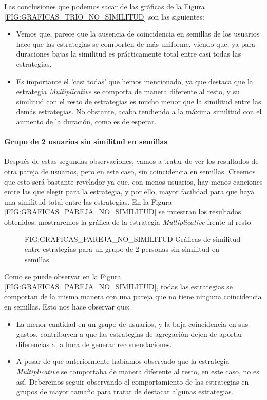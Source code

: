 Las conclusiones que podemos sacar de las gráficas de la Figura \ref{FIG:GRAFICAS_TRIO_NO_SIMILITUD} son las siguientes:

\begin{itemize}
    \item Vemos que, parece que la ausencia de coincidencia en semillas de los usuarios hace que las estrategias se comporten de más uniforme, viendo que, ya para duraciones
    bajas la similitud es prácticamente total entre casi todas las estrategias.
    \item Es importante el 'casi todas' que hemos mencionado, ya que destaca que la estrategia \textit{Multiplicative} se comporta de manera diferente al resto, y su similitud con el resto de estrategias
    es mucho menor que la similitud entre las demás estrategias. No obstante, acaba tendiendo a la máxima similitud con el aumento de la duración, como es de esperar.
\end{itemize}

\paragraph{Grupo de 2 usuarios sin similitud en semillas}

Después de estas segundas observaciones, vamos a tratar de ver los resultados de otra pareja de usuarios, pero en este caso, sin coincidencia en semillas. 
Creemos que esto será bastante revelador ya que, con menos usuarios, hay menos canciones entre las que elegir para la estrategia, y por ello, 
mayor facilidad para que haya una similitud total entre las estrategias.
En la Figura \ref{FIG:GRAFICAS_PAREJA_NO_SIMILITUD} se muestran los resultados obtenidos, mostraremos la gráfica de la estrategia \textit{Multiplicative} 
frente al resto.

\begin{figure}[Gráficas de similitud entre estrategias para un grupo de 2 personas sin similitud en semillas]{FIG:GRAFICAS_PAREJA_NO_SIMILITUD}
    {Gráficas de similitud entre estrategias para un grupo de 2 personas sin similitud en semillas}
\end{figure}

Como se puede observar en la Figura \ref{FIG:GRAFICAS_PAREJA_NO_SIMILITUD}, todas las estrategias se comportan de la misma manera con una pareja que 
no tiene ninguna coincidencia en semillas. Esto nos hace observar que:

\begin{itemize}
    \item La menor cantidad en un grupo de usuarios, y la baja coincidencia en sus gustos, contribuyen a que las estrategias de agregación 
    dejen de aportar diferencias a la hora de generar recomendaciones.
    \item A pesar de que anteriormente habíamos observado que la estrategia \textit{Multiplicative} se comportaba de manera diferente al resto,
    en este caso, no es así. Deberemos seguir observando el comportamiento de las estrategias en grupos de mayor tamaño para
    tratar de destacar algunas estrategias.
\end{itemize}

